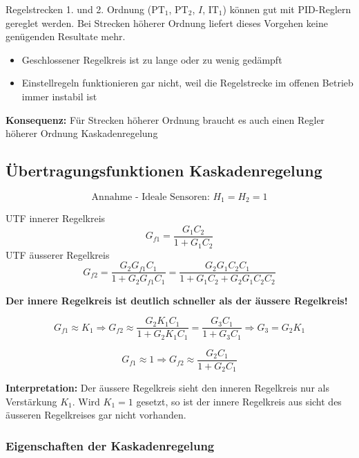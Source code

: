 Regelstrecken 1. und 2. Ordnung ($\text{PT}_1$, $\text{PT}_2$, $I$, $\text{IT}_1$) können gut mit PID-Reglern gereglet werden. 
Bei Strecken höherer Ordnung liefert dieses Vorgehen keine genügenden Resultate mehr.

\begin{itemize}
    \item Geschlossener Regelkreis ist zu lange oder zu wenig gedämpft
    \item Einstellregeln funktionieren gar nicht, weil die Regelstrecke im offenen Betrieb immer instabil ist
\end{itemize}

\textbf{Konsequenz:} Für Strecken höherer Ordnung braucht es auch einen Regler höherer Ordnung \textrightarrow Kaskadenregelung


\subsection{Übertragungsfunktionen Kaskadenregelung}

\begin{minipage}[c]{0.56\columnwidth}
    
    $$ \text{Annahme - Ideale Sensoren: } H_1 = H_2 = 1$$
    
\end{minipage}
\hfill
\begin{minipage}[c]{0.43\columnwidth}
    UTF innerer Regelkreis
    $$ G_{f1} = \frac{G_1 C_2}{1 + G_1 C_2} $$
    UTF äusserer Regelkreis
    $$ \textstyle{ G_{f2} = \frac{G_2 G_{f1} C_1}{1 + G_2 G_{f1} C_1} = \frac{G_2 G_1 C_2 C_1}{1 + G_1 C_2 + G_2 G_1 C_2 C_2}} $$
\end{minipage}

\vspace{0.2cm}
\textbf{Der innere Regelkreis ist deutlich schneller als der äussere Regelkreis!}

$$ G_{f1} \approx K_1 \Rightarrow G_{f2} \approx \frac{G_2 K_1 C_1}{1 + G_2 K_1 C_1} = \frac{G_3 C_1}{1 + G_3 C_1} \Rightarrow G_3 = G_2 K_1 $$

$$ G_{f1} \approx 1  \Rightarrow G_{f2} \approx \frac{G_2 C_1}{1 + G_2 C_1}  $$

\textbf{Interpretation:} Der äussere Regelkreis sieht den inneren Regelkreis nur als Verstärkung $K_1$. Wird $K_1 = 1$ gesetzt, so
ist der innere Regelkreis aus sicht des äusseren Regelkreises gar nicht vorhanden.


\subsubsection{Eigenschaften der Kaskadenregelung}

